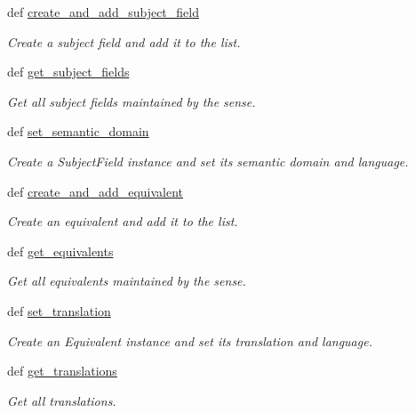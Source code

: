 \begin{DoxyCompactItemize}
def \hyperlink{classlmf_1_1src_1_1core_1_1sense_1_1_sense_a07d199aca70cf878cb2a71af7a96fa4c}{create\+\_\+and\+\_\+add\+\_\+subject\+\_\+field}
\begin{DoxyCompactList}\small\item\em Create a subject field and add it to the list. \end{DoxyCompactList}\item 
def \hyperlink{classlmf_1_1src_1_1core_1_1sense_1_1_sense_a907267d97926d04d20aaeefe475753d8}{get\+\_\+subject\+\_\+fields}
\begin{DoxyCompactList}\small\item\em Get all subject fields maintained by the sense. \end{DoxyCompactList}\item 
def \hyperlink{classlmf_1_1src_1_1core_1_1sense_1_1_sense_ad46f7e623293409ca06494b5fdeebe52}{set\+\_\+semantic\+\_\+domain}
\begin{DoxyCompactList}\small\item\em Create a Subject\+Field instance and set its semantic domain and language. \end{DoxyCompactList}\item 
def \hyperlink{classlmf_1_1src_1_1core_1_1sense_1_1_sense_a6004e31b078cad1d029283c4e3fedfc2}{create\+\_\+and\+\_\+add\+\_\+equivalent}
\begin{DoxyCompactList}\small\item\em Create an equivalent and add it to the list. \end{DoxyCompactList}\item 
def \hyperlink{classlmf_1_1src_1_1core_1_1sense_1_1_sense_ad01163c4440025fe86e4c00734aa8894}{get\+\_\+equivalents}
\begin{DoxyCompactList}\small\item\em Get all equivalents maintained by the sense. \end{DoxyCompactList}\item 
def \hyperlink{classlmf_1_1src_1_1core_1_1sense_1_1_sense_a97469fcc2116bb7b0dbf4826161512bd}{set\+\_\+translation}
\begin{DoxyCompactList}\small\item\em Create an Equivalent instance and set its translation and language. \end{DoxyCompactList}\item 
def \hyperlink{classlmf_1_1src_1_1core_1_1sense_1_1_sense_abeaa946d4c063f6784b84e443a102c2c}{get\+\_\+translations}
\begin{DoxyCompactList}\small\item\em Get all translations. \end{DoxyCompactList}\end{DoxyCompactItemize}
